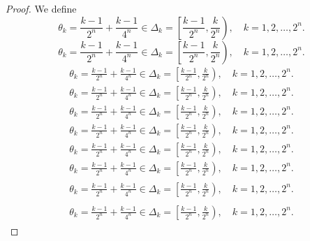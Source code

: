 \documentclass{amsart}
\numberwithin{equation}{section}
\begin{document}
\begin{proof}
We define
{
\begin{equation*} 
\theta_k=\frac{k-1}{2^n}+\frac{k-1}{4^n}\in \Delta_k=\left[\frac{k-1}{2^n},\frac{k}{2^n}\right),\quad k=1,2,\ldots ,2^n.
 \end{equation*}\fi  
{}\begin{equation}
\theta_k=\frac{k-1}{2^n}+\frac{k-1}{4^n}\in \Delta_k=\left[\frac{k-1}{2^n},\frac{k}{2^n}\right),\quad k=1,2,\ldots ,2^n.
\end{equation}\fi   
{}\begin{align*}
\theta_k=\frac{k-1}{2^n}+\frac{k-1}{4^n}\in \Delta_k=\left[\frac{k-1}{2^n},\frac{k}{2^n}\right),\quad k=1,2,\ldots ,2^n.
\end{align*}\fi   
{}\begin{align}
\theta_k=\frac{k-1}{2^n}+\frac{k-1}{4^n}\in \Delta_k=\left[\frac{k-1}{2^n},\frac{k}{2^n}\right),\quad k=1,2,\ldots ,2^n.
\end{align}\fi    
{}\begin{gather*}
\theta_k=\frac{k-1}{2^n}+\frac{k-1}{4^n}\in \Delta_k=\left[\frac{k-1}{2^n},\frac{k}{2^n}\right),\quad k=1,2,\ldots ,2^n.
\end{gather*}\fi  
{}\begin{gather}
\theta_k=\frac{k-1}{2^n}+\frac{k-1}{4^n}\in \Delta_k=\left[\frac{k-1}{2^n},\frac{k}{2^n}\right),\quad k=1,2,\ldots ,2^n.
\end{gather}\fi   
{}\begin{multline*}
\theta_k=\frac{k-1}{2^n}+\frac{k-1}{4^n}\in \Delta_k=\left[\frac{k-1}{2^n},\frac{k}{2^n}\right),\quad k=1,2,\ldots ,2^n.
\end{multline*}\fi  
{}\begin{multline}
\theta_k=\frac{k-1}{2^n}+\frac{k-1}{4^n}\in \Delta_k=\left[\frac{k-1}{2^n},\frac{k}{2^n}\right),\quad k=1,2,\ldots ,2^n.
\end{multline}\fi  
{}\begin{multline*}\begin{split}
\theta_k=\frac{k-1}{2^n}+\frac{k-1}{4^n}\in \Delta_k=\left[\frac{k-1}{2^n},\frac{k}{2^n}\right),\quad k=1,2,\ldots ,2^n.
\end{split}\end{multline*}\fi
{}\begin{multline}\begin{split}
\theta_k=\frac{k-1}{2^n}+\frac{k-1}{4^n}\in \Delta_k=\left[\frac{k-1}{2^n},\frac{k}{2^n}\right),\quad k=1,2,\ldots ,2^n.
\end{split}\end{multline}\fi
}
\end{proof}
\end{document}
